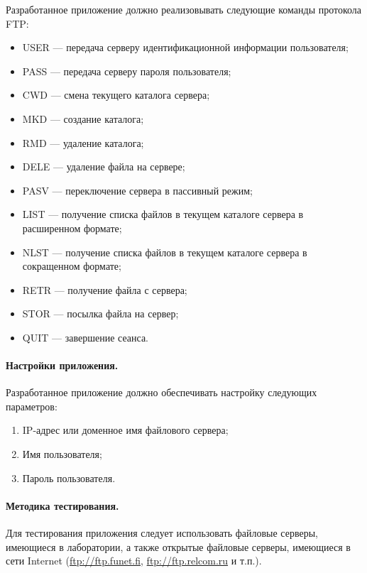 Разработанное приложение должно реализовывать следующие команды протокола FTP:

\begin{itemize}
	\item USER --- передача серверу идентификационной информации пользователя;
	\item PASS --- передача серверу пароля пользователя;
	\item CWD --- смена текущего каталога сервера;
	\item MKD --- создание каталога;
	\item RMD --- удаление каталога;
	\item DELE --- удаление файла на сервере;
	\item PASV --- переключение сервера в пассивный режим;
	\item LIST --- получение списка файлов в текущем каталоге сервера в расширенном формате;
	\item NLST --- получение списка файлов в текущем каталоге сервера в сокращенном формате;
	\item RETR --- получение файла с сервера;
	\item STOR --- посылка файла на сервер;
	\item QUIT --- завершение сеанса.
\end{itemize}

\paragraph{Настройки приложения.}

Разработанное приложение должно обеспечивать настройку следующих параметров:

\begin{enumerate}
	\item IP-адрес или доменное имя файлового сервера;
	\item Имя пользователя;
	\item Пароль пользователя.
\end{enumerate}

\paragraph{Методика тестирования.}

Для тестирования приложения следует использовать файловые серверы, имеющиеся в лаборатории, а также открытые файловые серверы, имеющиеся в сети Internet (\href{ftp://ftp.funet.fi}{ftp://ftp.funet.fi}, \href{ftp://ftp.relcom.ru}{ftp://ftp.relcom.ru} и т.п.).

